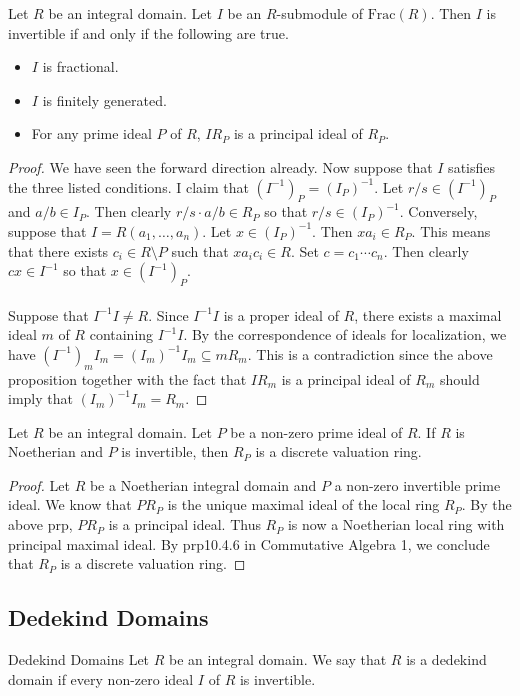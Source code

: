 \documentclass[a4paper]{article}
\begin{document}
\begin{prp}{}{} Let $R$ be an integral domain. Let $I$ be an $R$-submodule of $\text{Frac}(R)$. Then $I$ is invertible if and only if the following are true. 
\begin{itemize}
\item $I$ is fractional. 
\item $I$ is finitely generated. 
\item For any prime ideal $P$ of $R$, $IR_P$ is a principal ideal of $R_P$. 
\end{itemize} 
\begin{proof}
We have seen the forward direction already. Now suppose that $I$ satisfies the three listed conditions. I claim that $(I^{-1})_P=(I_P)^{-1}$. Let $r/s\in(I^{-1})_P$ and $a/b\in I_P$. Then clearly $r/s\cdot a/b\in R_P$ so that $r/s\in (I_P)^{-1}$. Conversely, suppose that $I=R(a_1,\dots,a_n)$. Let $x\in (I_P)^{-1}$. Then $xa_i\in R_P$. This means that there exists $c_i\in R\setminus P$ such that $xa_ic_i\in R$. Set $c=c_1\cdots c_n$. Then clearly $cx\in I^{-1}$ so that $x\in (I^{-1})_P$. \\~\\

Suppose that $I^{-1}I\neq R$. Since $I^{-1}I$ is a proper ideal of $R$, there exists a maximal ideal $m$ of $R$ containing $I^{-1}I$. By the correspondence of ideals for localization, we have $(I^{-1})_mI_m=(I_m)^{-1}I_m\subseteq mR_m$. This is a contradiction since the above proposition together with the fact that $IR_m$ is a principal ideal of $R_m$ should imply that $(I_m)^{-1}I_m=R_m$. 
\end{proof}
\end{prp}

\begin{prp}{}{} Let $R$ be an integral domain. Let $P$ be a non-zero prime ideal of $R$. If $R$ is Noetherian and $P$ is invertible, then $R_P$ is a discrete valuation ring. 
\begin{proof}
Let $R$ be a Noetherian integral domain and $P$ a non-zero invertible prime ideal. We know that $PR_P$ is the unique maximal ideal of the local ring $R_P$. By the above prp, $PR_P$ is a principal ideal. Thus $R_P$ is now a Noetherian local ring with principal maximal ideal. By prp10.4.6 in Commutative Algebra 1, we conclude that $R_P$ is a discrete valuation ring. 
\end{proof}
\end{prp}

\subsection{Dedekind Domains}
\begin{defn}{Dedekind Domains}{} Let $R$ be an integral domain. We say that $R$ is a dedekind domain if every non-zero ideal $I$ of $R$ is invertible. 
\end{defn}
\end{document}
